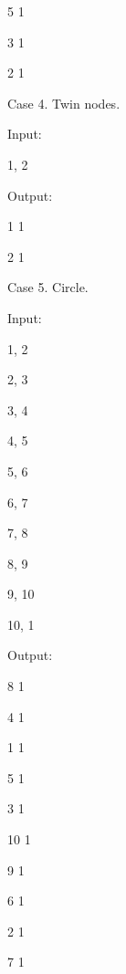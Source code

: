 \begin{itemize*}
5	1

3	1

2	1

\item{Case 4. Twin nodes.}

Input:

1, 2

Output:

1	1

2	1

\item{Case 5. Circle.}

Input:

1, 2

2, 3

3, 4

4, 5

5, 6

6, 7

7, 8

8, 9

9, 10

10, 1

Output:

8	1

4	1

1	1

5	1

3	1

10	1

9	1

6	1

2	1

7	1
\end{itemize*}

